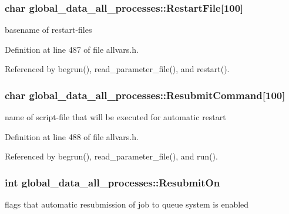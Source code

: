 \hypertarget{structglobal__data__all__processes_a67e197a37469217aa8ad32c42230b286}{
\subsubsection[{RestartFile}]{\setlength{\rightskip}{0pt plus 5cm}char {\bf global\_\-data\_\-all\_\-processes::RestartFile}\mbox{[}100\mbox{]}}}
\label{structglobal__data__all__processes_a67e197a37469217aa8ad32c42230b286}
basename of restart-\/files 

Definition at line 487 of file allvars.h.



Referenced by begrun(), read\_\-parameter\_\-file(), and restart().

\hypertarget{structglobal__data__all__processes_a59f86964a3a1b03933a787cfc280951a}{
\subsubsection[{ResubmitCommand}]{\setlength{\rightskip}{0pt plus 5cm}char {\bf global\_\-data\_\-all\_\-processes::ResubmitCommand}\mbox{[}100\mbox{]}}}
\label{structglobal__data__all__processes_a59f86964a3a1b03933a787cfc280951a}
name of script-\/file that will be executed for automatic restart 

Definition at line 488 of file allvars.h.



Referenced by begrun(), read\_\-parameter\_\-file(), and run().

\hypertarget{structglobal__data__all__processes_a6578ce0ee08f770891c662c0ab4ad10c}{
\subsubsection[{ResubmitOn}]{\setlength{\rightskip}{0pt plus 5cm}int {\bf global\_\-data\_\-all\_\-processes::ResubmitOn}}}
\label{structglobal__data__all__processes_a6578ce0ee08f770891c662c0ab4ad10c}
flags that automatic resubmission of job to queue system is enabled 

